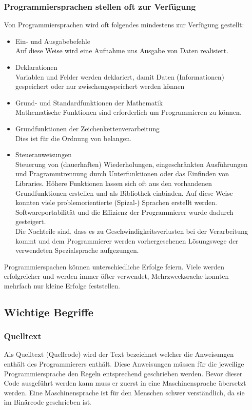\documentclass[12pt,a4paper]{report}
\begin{document}
\subsubsection{Programmiersprachen stellen oft zur Verfügung}
Von Programmiersprachen wird oft folgendes mindestens zur Verfügung gestellt:
\begin{itemize}
\item Ein- und Ausgabebefehle\\
Auf diese Weise wird eine Aufnahme uns Ausgabe von Daten realisiert.
\item Deklarationen\\
Variablen und Felder werden deklariert, damit Daten (Informationen) gespeichert oder nur zwischengespeichert werden können 
\item Grund- und Standardfunktionen der Mathematik\\
Mathematische Funktionen sind erforderlich um Programmieren zu können.
\item Grundfunktionen der Zeichenkettenverarbeitung\\
Dies ist für die Ordnung von belangen.
\item Steueranweisungen\\
Steuerung von (dauerhaften) Wiederholungen, eingeschränkten Ausführungen und Pragrammtrennung durch Unterfunktionen oder das Einfinden von Libraries. Höhere Funktionen lassen sich oft aus den vorhandenen Grundfunktionen erstellen und als Bibliothek einbinden. Auf diese Weise konnten viele problemorientierte (Spizal-) Sprachen erstellt werden. Softwareportabilität und die Effizienz der Programmierer wurde dadurch gesteigert.\\
Die Nachteile sind, dass es zu Geschwindigkeitsverlusten bei der Verarbeitung kommt und dem Programmierer werden vorhergesehenen Lösungswege der verwendeten Spezialsprache aufgezungen.
\end{itemize}
Programmierspachen können unterschiedliche Erfolge feiern. Viele werden erfolgreicher und werden immer öfter verwendet,  Mehrzwecksrache konnten mehrfach nur kleine Erfolge feststellen.

\subsection{Wichtige Begriffe}
\subsubsection{Quelltext}
Als Quelltext (Quellcode) wird der Text bezeichnet welcher die Anweisungen enthält des Programmierers enthält. Diese Anweisungen müssen für die jeweilige Programmiersprache den Regeln entsprechend geschrieben werden. Bevor dieser Code ausgeführt werden kann muss er zuerst in eine Maschinensprache übersetzt werden. Eine Maschinensprache ist für den Menschen schwer verständlich, da sie im Binärcode geschrieben ist.
\end{document}
